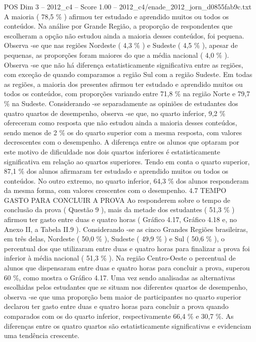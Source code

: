 \begin{textsample}{POS Dim 3 – 2012\_c4 – Score 1.00 – 2012\_c4/enade\_2012\_jorn\_d0855fab9c.txt}
A maioria ( 78,5 \% ) afirmou ter estudado e aprendido muitos ou todos os conteúdos.
Na análise por Grande Região, a proporção de respondentes que escolheram a opção não estudou ainda a maioria desses conteúdos, foi pequena.
Observa -se que nas regiões Nordeste ( 4,3 \% ) e Sudeste ( 4,5 \% ), apesar de pequenas, as proporções foram maiores do que a média nacional ( 4,0 \% ).
Observa -se que não há diferença estatisticamente significativa entre as regiões, com exceção de quando comparamos a região Sul com a região Sudeste.
Em todas as regiões, a maioria dos presentes afirmou ter estudado e aprendido muitos ou todos os conteúdos, com proporções variando entre 71,8 \% na região Norte e 79,7 \% na Sudeste.
Considerando -se separadamente as opiniões de estudantes dos quatro quartos de desempenho, observa -se que, no quarto inferior, 9,2 \% ofereceram como resposta que não estudou ainda a maioria desses conteúdos, sendo menos de 2 \% os do quarto superior com a mesma resposta, com valores decrescentes com o desempenho.
A diferença entre os alunos que optaram por este motivo de dificuldade nos dois quartos inferiores é estatisticamente significativa em relação ao quartos superiores.
Tendo em conta o quarto superior, 87,1 \% dos alunos afirmaram ter estudado e aprendido muitos ou todos os conteúdos.
No outro extremo, no quarto inferior, 64,3 \% dos alunos responderam da mesma forma, com valores crescentes com o desempenho. 4.7 TEMPO GASTO PARA CONCLUIR A PROVA Ao responderem sobre o tempo de conclusão da prova ( Questão 9 ), mais da metade dos estudantes ( 51,3 \% ) afirmou ter gasto entre duas e quatro horas ( Gráfico 4.17, Gráfico 4.18 e, no Anexo II, a Tabela II.9 ).
Considerando -se as cinco Grandes Regiões brasileiras, em três delas, Nordeste ( 50,0 \% ), Sudeste ( 49,9 \% ) e Sul ( 50,6 \% ), o percentual dos que utilizaram entre duas e quatro horas para finalizar a prova foi inferior à média nacional ( 51,3 \% ).
Na região Centro-Oeste o percentual de alunos que dispensaram entre duas e quatro horas para concluir a prova, superou 60 \%, como mostra o Gráfico 4.17.
Uma vez sendo analisadas as alternativas escolhidas pelos estudantes que se situam nos diferentes quartos de desempenho, observa -se que uma proporção bem maior de participantes no quarto superior declarou ter gasto entre duas e quatro horas para concluir a prova quando comparados com os do quarto inferior, respectivamente 66,4 \% e 30,7 \%.
As diferenças entre os quatro quartos são estatisticamente significativas e evidenciam uma tendência crescente.

\end{textsample}
